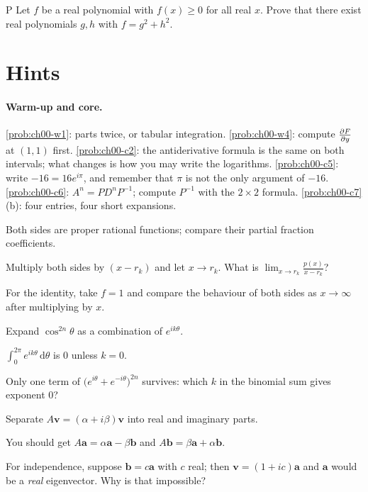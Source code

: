\begin{problem}{P}\label{prob:ch00-p3}
Let $f$ be a real polynomial with $f(x)\ge 0$ for all real $x$. Prove that
there exist real polynomials $g, h$ with $f = g^2 + h^2$.
\end{problem}

\section{Hints}\label{sec:ch00-hints}

\paragraph{Warm-up and core.}
\cref{prob:ch00-w1}: parts twice, or tabular integration.
\cref{prob:ch00-w4}: compute $\frac{\partial F}{\partial y}$ at $(1,1)$ first.
\cref{prob:ch00-c2}: the antiderivative formula is the same on both intervals;
what changes is how you may write the logarithms.
\cref{prob:ch00-c5}: write $-16 = 16e^{i\pi}$, and remember that $\pi$ is not
the only argument of $-16$.
\cref{prob:ch00-c6}: $A^n = PD^nP^{-1}$; compute $P^{-1}$ with the $2\times2$
formula.
\cref{prob:ch00-c7}(b): four entries, four short expansions.

\begin{hintlevels}
  \item Both sides are proper rational functions; compare their partial
        fraction coefficients.
  \item Multiply both sides by $(x - r_k)$ and let $x\to r_k$. What is
        $\lim_{x\to r_k}\frac{p(x)}{x-r_k}$?
  \item For the identity, take $f = 1$ and compare the behaviour of both sides
        as $x\to\infty$ after multiplying by $x$.
\end{hintlevels}

\begin{hintlevels}
  \item Expand $\cos^{2n}\theta$ as a combination of $e^{ik\theta}$.
  \item $\int_0^{2\pi}e^{ik\theta}\,\mathrm{d}\theta$ is $0$ unless $k = 0$.
  \item Only one term of $\bigl(e^{i\theta} + e^{-i\theta}\bigr)^{2n}$ survives:
        which $k$ in the binomial sum gives exponent $0$?
\end{hintlevels}

\begin{hintlevels}
  \item Separate $A\mathbf v = (\alpha + i\beta)\mathbf v$ into real and
        imaginary parts.
  \item You should get $A\mathbf a = \alpha\mathbf a - \beta\mathbf b$ and
        $A\mathbf b = \beta\mathbf a + \alpha\mathbf b$.
  \item For independence, suppose $\mathbf b = c\mathbf a$ with $c$ real; then
        $\mathbf v = (1 + ic)\mathbf a$ and $\mathbf a$ would be a \emph{real}
        eigenvector. Why is that impossible?
\end{hintlevels}

